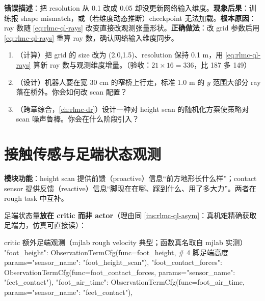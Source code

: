 \begin{pitfall}
\textbf{错误描述}：把 resolution 从 0.1 改成 0.05 却没更新网络输入维度。\textbf{现象后果}：训练报 shape mismatch，或（若维度动态推断）checkpoint 无法加载。\textbf{根本原因}：ray 数随 \eqref{eq:rlmc-ql-rays} 改变直接改观测张量形状。\textbf{正确做法}：改 grid 参数后用 \eqref{eq:rlmc-ql-rays} 重算 ray 数，确认网络输入维度同步。
\end{pitfall}

\begin{practice}[地形与扫描]
\begin{enumerate}
\item （计算）把 grid 的 size 改为 (2.0,1.5)、resolution 保持 0.1 m，用 \eqref{eq:rlmc-ql-rays} 算新 ray 数与观测维度增量。（验收：$21\times 16=336$，比 187 多 149）
\item （设计）机器人要在宽 30 cm 的窄桥上行走，标准 1.0 m 的 $y$ 范围大部分 ray 落在桥外。你会如何改 scan 配置？
\item （跨章综合，\cref{ch:rlmc-dr}）设计一种对 height scan 的随机化方案使策略对 scan 噪声鲁棒。你会在什么阶段引入？
\end{enumerate}
\end{practice}

\section{接触传感与足端状态观测}
\label{sec:rlmc-ql-contact}

\textbf{模块功能}：height scan 提供前馈（proactive）信息“前方地形长什么样”；contact sensor 提供反馈（reactive）信息“脚现在在哪、踩到什么、用了多大力”。两者在 rough task 中互补。

足端状态量\textbf{放在 critic 而非 actor}（理由同 \cref{ins:rlmc-ql-asym}：真机难精确获取足端力，仿真可直接读）：

\begin{codebox}[Python]{critic 额外足端观测（mjlab rough velocity 典型；函数真名取自 mjlab 实测）}
"foot_height":         ObservationTermCfg(func=foot_height,           # 4 脚足端高度
                               params={"sensor_name": "foot_height_scan"}),
"foot_contact_forces": ObservationTermCfg(func=foot_contact_forces,
                               params={"sensor_name": "feet_contact"}),
"foot_air_time":       ObservationTermCfg(func=foot_air_time,
                               params={"sensor_name": "feet_contact"}),
\end{codebox}

